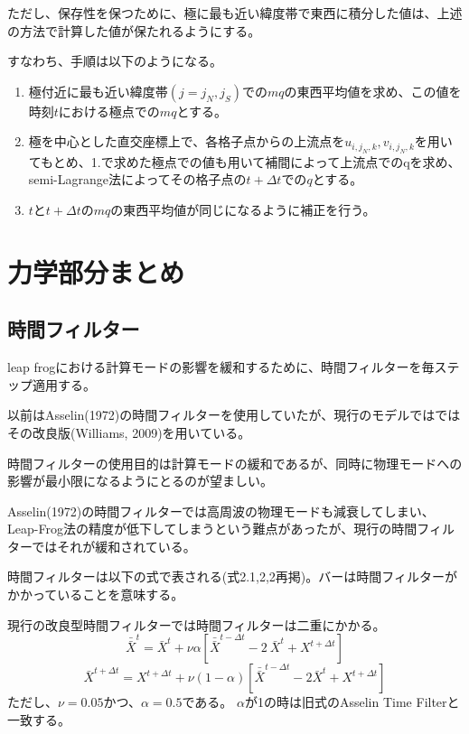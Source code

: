 \documentclass{jsbook}
\begin{document}
ただし、保存性を保つために、極に最も近い緯度帯で東西に積分した値は、上述の方法で計算した値が保たれるようにする。

すなわち、手順は以下のようになる。

\begin{enumerate}
\item 極付近に最も近い緯度帯$(j=j_{N},j_{S})$での$mq$の東西平均値を求め、この値を時刻$t$における極点での$mq$とする。
\item 極を中心とした直交座標上で、各格子点からの上流点を$u_{i,j_{N},k},v_{i,j_{N},k}$を用いてもとめ、1.で求めた極点での値も用いて補間によって上流点でのqを求め、semi-Lagrange法によってその格子点の$t+\Delta t$での$q$とする。
\item $t$と$t+\Delta t$の$mq$の東西平均値が同じになるように補正を行う。
\end{enumerate}
\section{力学部分まとめ}
\subsection{時間フィルター}
leap frogにおける計算モードの影響を緩和するために、時間フィルターを毎ステップ適用する。

以前はAsselin(1972)の時間フィルターを使用していたが、現行のモデルではではその改良版(Williams, 2009)を用いている。

時間フィルターの使用目的は計算モードの緩和であるが、同時に物理モードへの影響が最小限になるようにとるのが望ましい。

Asselin(1972)の時間フィルターでは高周波の物理モードも減衰してしまい、Leap-Frog法の精度が低下してしまうという難点があったが、現行の時間フィルターではそれが緩和されている。

時間フィルターは以下の式で表される(式2.1,2,2再掲)。バーは時間フィルターがかかっていることを意味する。

現行の改良型時間フィルターでは時間フィルターは二重にかかる。
\begin{equation}
\bar{\bar{X}}^{t} = \bar{X}^{t} + \nu \alpha [\bar{\bar{X}}^{t-\Delta t} - 2 \
\bar{X}^{t} + X^{t+\Delta t}] 
\end{equation}
\begin{equation}
\bar{X}^{t+\Delta t} = X^{t+\Delta t} + \nu (1-\alpha) [\bar{\bar{X}}^{t-\Delta t} - 2 \bar{X}^{t} + X^{t+\Delta t}] 
\end{equation}
ただし、$\nu=0.05$かつ、$\alpha=0.5$である。
$\alpha$が1の時は旧式のAsselin Time Filterと一致する。
\end{document}
